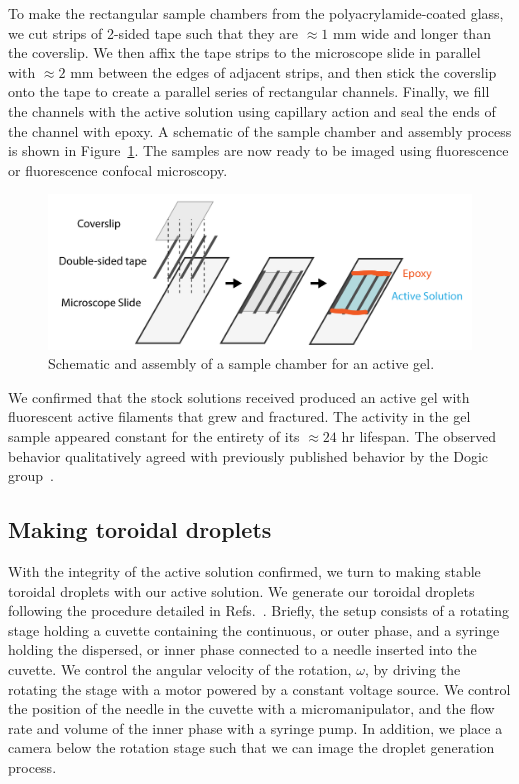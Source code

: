 To make the rectangular sample chambers from the polyacrylamide-coated glass, we cut strips of 2-sided tape such that they are $\approx1$ mm wide and longer than the coverslip.
We then affix the tape strips to the microscope slide in parallel with $\approx 2$ mm between the edges of adjacent strips, and then stick the coverslip onto the tape to create a parallel series of rectangular channels.
Finally, we fill the channels with the active solution using capillary action and seal the ends of the channel with epoxy.
A schematic of the sample chamber and assembly process is shown in Figure~\ref{f:3-SampleChamber}.
The samples are now ready to be imaged using fluorescence or fluorescence confocal microscopy.
\begin{figure}
  \centering
  \includegraphics{figures/C3/Ch3-Figs_GelSampleChamber.png}
  \caption{Schematic and assembly of a sample chamber for an active gel.}
  \label{f:3-SampleChamber}
\end{figure}

We confirmed that the stock solutions received produced an active gel with fluorescent active filaments that grew and fractured.
The activity in the gel sample appeared constant for the entirety of its  $\approx 24$ hr lifespan.
The observed behavior qualitatively agreed with previously published behavior by the Dogic group~\cite{RN3}.


\subsection{Making toroidal droplets}
With the integrity of the active solution confirmed, we turn to making stable toroidal droplets with our active solution.
We generate our toroidal droplets following the procedure detailed in Refs.~\cite{RN29,RN47,RN257}.
Briefly, the setup consists of a rotating stage holding a cuvette containing the continuous, or outer phase, and a syringe holding the dispersed, or inner phase connected to a needle inserted into the cuvette.
We control the angular velocity of the rotation, $\omega$, by driving the rotating the stage with a motor powered by a constant voltage source.
We control the position of the needle in the cuvette with a micromanipulator, and the flow rate and volume of the inner phase with a syringe pump.
In addition, we place a camera below the rotation stage such that we can image the droplet generation process.


